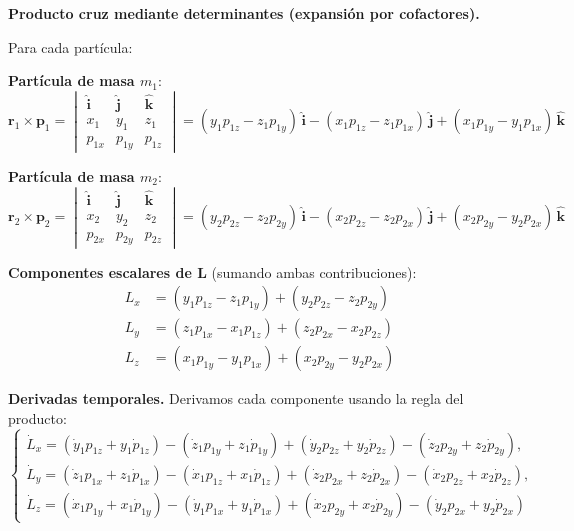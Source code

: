 \documentclass{article}
\begin{document}

\textcolor{orange(colorwheel)}{\textbf{Producto cruz mediante determinantes (expansión por cofactores).}} 

Para cada partícula:

\textcolor{Cerulean}{\textbf{Partícula de masa $m_{1}$}}:
\[
\boldsymbol{r}_1\times\boldsymbol{p}_1=
\begin{vmatrix}
\hat{\boldsymbol{i}} & \hat{\boldsymbol{j}} & \hat{\boldsymbol{k}}\\
x_1 & y_1 & z_1\\
p_{1x} & p_{1y} & p_{1z}
\end{vmatrix}
=
(y_1p_{1z}-z_1p_{1y})\,\hat{\boldsymbol{i}}
-(x_1p_{1z}-z_1p_{1x})\,\hat{\boldsymbol{j}}
+(x_1p_{1y}-y_1p_{1x})\,\hat{\boldsymbol{k}}
\]

\textcolor{pakistangreen}{\textbf{Partícula de masa $m_{2}$}}:
\[
\boldsymbol{r}_2\times\boldsymbol{p}_2=
\begin{vmatrix}
\hat{\boldsymbol{i}} & \hat{\boldsymbol{j}} & \hat{\boldsymbol{k}}\\
x_2 & y_2 & z_2\\
p_{2x} & p_{2y} & p_{2z}
\end{vmatrix}
=
(y_2p_{2z}-z_2p_{2y})\,\hat{\boldsymbol{i}}
-(x_2p_{2z}-z_2p_{2x})\,\hat{\boldsymbol{j}}
+(x_2p_{2y}-y_2p_{2x})\,\hat{\boldsymbol{k}}
\]

\textcolor{Apple Green}{\textbf{Componentes escalares de $\boldsymbol L$}} (sumando ambas contribuciones):
\[
\boxed{
\begin{aligned}
L_x &= (y_1p_{1z}-z_1p_{1y})+(y_2p_{2z}-z_2p_{2y})\\[2pt]
L_y &= (z_1p_{1x}-x_1p_{1z})+(z_2p_{2x}-x_2p_{2z})\\[2pt]
L_z &= (x_1p_{1y}-y_1p_{1x})+(x_2p_{2y}-y_2p_{2x})
\end{aligned}
}
\]


\textcolor{vividviolet}{\textbf{Derivadas temporales.}} 
Derivamos cada componente usando la regla del producto:
\[
\begin{cases}
\dot{L}_x = (\dot{y}_1p_{1z}+y_1\dot{p}_{1z})-(\dot{z}_1p_{1y}+z_1\dot{p}_{1y})
           + (\dot{y}_2p_{2z}+y_2\dot{p}_{2z})-(\dot{z}_2p_{2y}+z_2\dot{p}_{2y}), \\[6pt]
\dot{L}_y = (\dot{z}_1p_{1x}+z_1\dot{p}_{1x})-(\dot{x}_1p_{1z}+x_1\dot{p}_{1z})
           + (\dot{z}_2p_{2x}+z_2\dot{p}_{2x})-(\dot{x}_2p_{2z}+x_2\dot{p}_{2z}), \\[6pt]
\dot{L}_z = (\dot{x}_1p_{1y}+x_1\dot{p}_{1y})-(\dot{y}_1p_{1x}+y_1\dot{p}_{1x})
           + (\dot{x}_2p_{2y}+x_2\dot{p}_{2y})-(\dot{y}_2p_{2x}+y_2\dot{p}_{2x})
\end{cases}
\]
\end{document}

